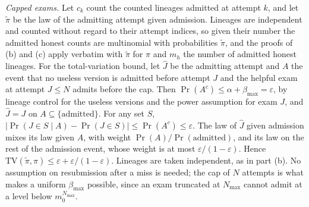 \emph{Capped exams.} Let $c_k$ count the counted lineages admitted at attempt $k$, and let $\tilde\pi$ be the law of the admitting attempt given admission. Lineages are independent and counted without regard to their attempt indices, so given their number the admitted honest counts are multinomial with probabilities $\tilde\pi$, and the proofs of (b) and (c) apply verbatim with $\tilde\pi$ for $\pi$ and $m_h$ the number of admitted honest lineages. For the total-variation bound, let $\hat J$ be the admitting attempt and $A$ the event that no useless version is admitted before attempt $J$ and the helpful exam at attempt $J\le N$ admits before the cap. Then $\Pr(A^c)\le\alpha+\beta_{\max}=\varepsilon$, by lineage control for the useless versions and the power assumption for exam $J$, and $\hat J=J$ on $A\subseteq\{\text{admitted}\}$. For any set $S$, $|\Pr(J\in S\mid A)-\Pr(J\in S)|\le\Pr(A^c)\le\varepsilon$. The law of $\hat J$ given admission mixes its law given $A$, with weight $\Pr(A)/\Pr(\text{admitted})$, and its law on the rest of the admission event, whose weight is at most $\varepsilon/(1-\varepsilon)$. Hence $\mathrm{TV}(\tilde\pi,\pi)\le\varepsilon+\varepsilon/(1-\varepsilon)$. Lineages are taken independent, as in part (b). No assumption on resubmission after a miss is needed; the cap of $N$ attempts is what makes a uniform $\beta_{\max}$ possible, since an exam truncated at $N_{\max}$ cannot admit at a level below $m_0^{N_{\max}}$.

